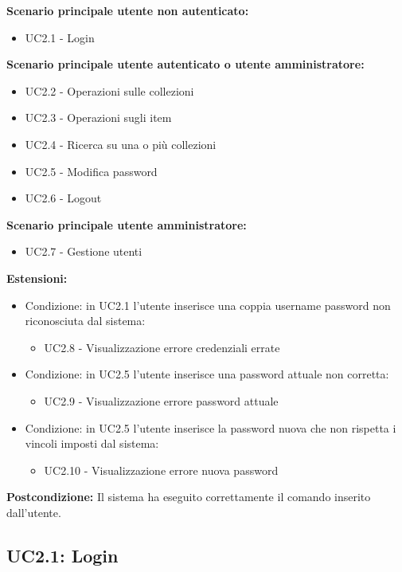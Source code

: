\documentclass{scalatekids-article}
\begin{document}
\textbf{Scenario principale utente non autenticato:} 
\begin{itemize}
  \item UC2.1 - Login
\end{itemize}
\textbf{Scenario principale utente autenticato o utente amministratore:} 
\begin{itemize}
  \item UC2.2 - Operazioni sulle collezioni
  \item UC2.3 - Operazioni sugli item
  \item UC2.4 - Ricerca su una o più collezioni
  \item UC2.5 - Modifica password
  \item UC2.6 - Logout
\end{itemize}
\textbf{Scenario principale utente amministratore:} 
\begin{itemize}
  \item UC2.7 - Gestione utenti
\end{itemize}
\textbf{Estensioni:}
\begin{itemize}
  \item Condizione: in UC2.1 l'utente inserisce una coppia username password non riconosciuta dal sistema:
  \begin{itemize}
    \item UC2.8 - Visualizzazione errore credenziali errate
  \end{itemize}
  \item Condizione: in UC2.5 l'utente inserisce una password attuale non corretta:
  \begin{itemize}
    \item UC2.9 - Visualizzazione errore password attuale
  \end{itemize}
  \item Condizione: in UC2.5 l'utente inserisce la password nuova che non rispetta i vincoli imposti dal sistema: %
  \begin{itemize}
    \item UC2.10 - Visualizzazione errore nuova password
  \end{itemize}
\end{itemize}
\textbf{Postcondizione:} Il sistema ha eseguito correttamente il comando inserito dall'utente.

\subsection{UC2.1: Login}
\end{document}

